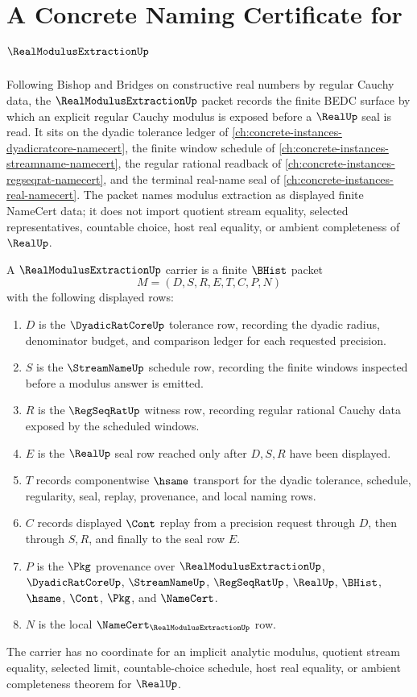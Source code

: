 \chapter{A Concrete Naming Certificate for $\RealModulusExtractionUp$}
\label{ch:concrete-instances-real-modulus-extraction-namecert}

Following Bishop and Bridges on constructive real numbers by regular Cauchy data, the $\RealModulusExtractionUp$ packet records the finite BEDC surface by which an explicit regular Cauchy modulus is exposed before a $\RealUp$ seal is read. It sits on the dyadic tolerance ledger of \autoref{ch:concrete-instances-dyadicratcore-namecert}, the finite window schedule of \autoref{ch:concrete-instances-streamname-namecert}, the regular rational readback of \autoref{ch:concrete-instances-regseqrat-namecert}, and the terminal real-name seal of \autoref{ch:concrete-instances-real-namecert}. The packet names modulus extraction as displayed finite NameCert data; it does not import quotient stream equality, selected representatives, countable choice, host real equality, or ambient completeness of $\RealUp$.

\begin{definition}
\label{def:real-modulus-extraction-carrier}
A $\RealModulusExtractionUp$ carrier is a finite $\BHist$ packet
$$
M=(D,S,R,E,T,C,P,N)
$$
with the following displayed rows:
\begin{enumerate}
\item $D$ is the $\DyadicRatCoreUp$ tolerance row, recording the dyadic radius, denominator budget, and comparison ledger for each requested precision.
\item $S$ is the $\StreamNameUp$ schedule row, recording the finite windows inspected before a modulus answer is emitted.
\item $R$ is the $\RegSeqRatUp$ witness row, recording regular rational Cauchy data exposed by the scheduled windows.
\item $E$ is the $\RealUp$ seal row reached only after $D,S,R$ have been displayed.
\item $T$ records componentwise $\hsame$ transport for the dyadic tolerance, schedule, regularity, seal, replay, provenance, and local naming rows.
\item $C$ records displayed $\Cont$ replay from a precision request through $D$, then through $S,R$, and finally to the seal row $E$.
\item $P$ is the $\Pkg$ provenance over $\RealModulusExtractionUp$, $\DyadicRatCoreUp$, $\StreamNameUp$, $\RegSeqRatUp$, $\RealUp$, $\BHist$, $\hsame$, $\Cont$, $\Pkg$, and $\NameCert$.
\item $N$ is the local $\NameCert_{\RealModulusExtractionUp}$ row.
\end{enumerate}
The carrier has no coordinate for an implicit analytic modulus, quotient stream equality, selected limit, countable-choice schedule, host real equality, or ambient completeness theorem for $\RealUp$.
\end{definition}

